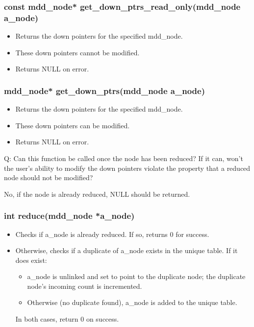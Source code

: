\documentclass[12pt]{article}
\newcommand{\TBD}[1]{{\color{blue}{\bf TBD:} #1}}
\begin{document}
\subsubsection{const mdd\_node* get\_down\_ptrs\_read\_only(mdd\_node a\_node)}

\begin{itemize}
\item
Returns the down pointers for the specified mdd\_node.
\item
These down pointers cannot be modified.
\item
Returns NULL on error.
\end{itemize}

\subsubsection{mdd\_node* get\_down\_ptrs(mdd\_node a\_node)}

\begin{itemize}
\item
Returns the down pointers for the specified mdd\_node.
\item
These down pointers can be modified.
\item
Returns NULL on error.
\end{itemize}

\TBD{
Q: Can this function be called once the node has been reduced? If it can, won't the user's ability to modify the down pointers violate the property that a reduced node should not be modified?

No, if the node is already reduced, NULL should be returned.
}

\subsubsection{int reduce(mdd\_node *a\_node)}

\begin{itemize}
\item
Checks if a\_node is already reduced. If so, returns 0 for success.
\item
Otherwise, checks if a duplicate of a\_node exists in the unique table. If it does exist:
\begin{itemize}
\item
a\_node is unlinked and set to point to the duplicate node; the duplicate
node's incoming count is incremented.
\item
Otherwise (no duplicate found), a\_node is added to the unique table.
\end{itemize}
In both cases, return 0 on success.
\end{itemize}
\end{document}

